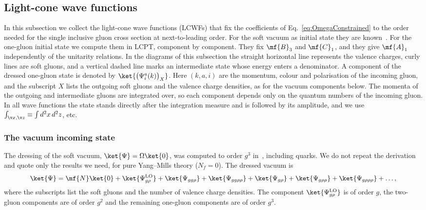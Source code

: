 \subsection{Light-cone wave functions}\label{subsec:lcwf}
In this subsection we collect the light-cone wave functions (LCWFs) that fix the coefficients of
Eq.~\eqref{eq:OmegaConstrained} to the order needed for the single inclusive gluon cross section at
next-to-leading order. For the soft vacuum as initial state they are known~\cite{Lublinsky:2016meo}. For the
one-gluon initial state we compute them in LCPT, component by component. They fix $\mf{B}_{3}$ and
$\mf{C}_{1}$, and they give $\mf{A}_{1}$ independently of the unitarity relations. In the diagrams of this
subsection the straight horizontal line represents the valence charges, curly lines are soft gluons, and
a vertical dashed line marks an intermediate state whose energy enters a denominator. A component of the
dressed one-gluon state is denoted by $\ket{\big(\Psi^{a}_{i}(k)\big)_{X}}$. Here $(k,a,i)$ are the momentum, colour
and polarisation of the incoming gluon, and the subscript $X$ lists the outgoing soft gluons and the
valence charge densities, as for the vacuum components below. The momenta of the outgoing and intermediate
gluons are integrated over, so each component depends only on the quantum numbers of the incoming gluon.
In all wave functions the state stands directly after the integration measure and is followed by its
amplitude, and we use $\int_{\v x,\v z}\equiv\int d^{2}x\,d^{2}z$, etc.

\subsubsection{The vacuum incoming state}\label{sec:vacin}
The dressing of the soft vacuum, $\ket{\Psi}=\Omega\ket{0}$, was computed to order $g^{3}$
in~\cite{Lublinsky:2016meo}, including quarks. We do not repeat the derivation and quote only the results
we need, for pure Yang--Mills theory ($N_{f}=0$). The dressed vacuum is
\begin{align}\label{NLOWF}
\ket{\Psi}=\mf{N}\ket{0}+\ket{\Psi^{\rm LO}_{g\rho}}+\ket{\Psi_{gg\rho}}+\ket{\Psi_{gg\rho\rho}}
+\ket{\Psi_{g\rho}}+\ket{\Psi_{g\rho\rho}}+\ket{\Psi_{g\rho\rho\rho}}+\dots,
\end{align}
where the subscripts list the soft gluons and the number of valence charge densities. The component
$\ket{\Psi^{\rm LO}_{g\rho}}$ is of order $g$, the two-gluon components are of order $g^{2}$ and the
remaining one-gluon components are of order $g^{3}$.

